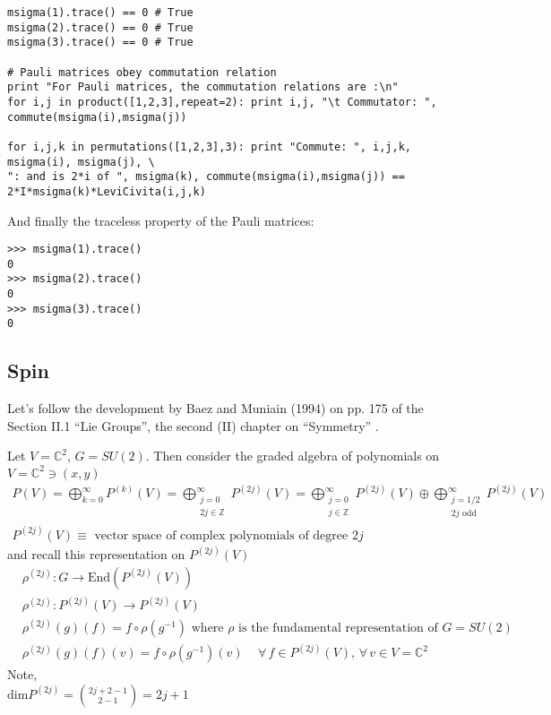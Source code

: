 \documentclass[10pt]{amsart}
\begin{document}
\begin{multicols*}{2}
\begin{lstlisting}
msigma(1).trace() == 0 # True
msigma(2).trace() == 0 # True
msigma(3).trace() == 0 # True

# Pauli matrices obey commutation relation
print "For Pauli matrices, the commutation relations are :\n"
for i,j in product([1,2,3],repeat=2): print i,j, "\t Commutator: ", commute(msigma(i),msigma(j))

for i,j,k in permutations([1,2,3],3): print "Commute: ", i,j,k, msigma(i), msigma(j), \ 
": and is 2*i of ", msigma(k), commute(msigma(i),msigma(j)) == 2*I*msigma(k)*LeviCivita(i,j,k)

\end{lstlisting}

And finally the traceless property of the Pauli matrices:
\begin{lstlisting}
>>> msigma(1).trace()
0
>>> msigma(2).trace()
0
>>> msigma(3).trace()
0
\end{lstlisting} 

\subsection{Spin}

Let's follow the development by Baez and Muniain (1994) on pp. 175 of the Section II.1 ``Lie Groups'', the second (II) chapter on ``Symmetry'' \cite{JBaezJMuniain1994}.  

Let $V = \mathbb{C}^2$, $G=SU(2)$.  Then consider the graded algebra of polynomials on $V = \mathbb{C}^2 \ni (x,y)$
\[
\begin{gathered}
  P(V) = \bigoplus_{k=0}^{\infty} P^{(k)}(V) = \bigoplus_{ \substack{ j =0 \\ 2j \in \mathbb{Z}} }^{\infty} P^{(2j)}(V) = \bigoplus_{ \substack{ j=0 \\ j\in \mathbb{Z} }}^{\infty} P^{(2j)}(V) \oplus \bigoplus_{ \substack{ j=1/2 \\ 2j \text{ odd } } }^{\infty} P^{(2j)}(V) \\
  P^{(2j)}(V) \equiv \text{ vector space of complex polynomials of degree $2j$ }
\end{gathered}
\]
and recall this representation on $P^{(2j)}(V)$
\[
\begin{aligned}
  & \rho^{(2j)}:G \to \text{End}(P^{(2j)}(V)) \\ 
  & \rho^{(2j)}: P^{(2j)}(V) \to P^{(2j)}(V) \\ 
 & \rho^{(2j)}(g)(f) = f\circ \rho(g^{-1}) \text{ where $\rho$ is the fundamental representation of $G=SU(2)$ }\\
    & \rho^{(2j)}(g)(f)(v) = f\circ \rho(g^{-1})(v) \quad \, \forall \, f \in P^{(2j)}(V), \, \forall \, v \in V = \mathbb{C}^2
\end{aligned}
\]
Note, \\
$\text{dim}P^{(2j)} = \binom{2j+2-1 }{2-1} = 2j+1$


\end{multicols*}
\end{document}
